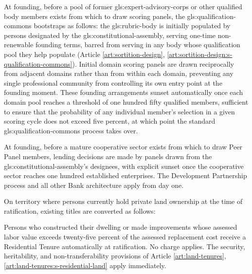 


At founding, before a pool of former \gls{gls:expert-advisory-corps} or other qualified body members exists from which to draw scoring panels, the \gls{gls:qualification-commons} bootstraps as follows: the \gls{gls:rubric-body} is initially populated by persons designated by the \gls{gls:constitutional-assembly}, serving one-time non-renewable founding terms, barred from serving in any body whose qualification pool they help populate (Article \ref{art:sortition-design}, \ref{art:sortition-design:s-qualification-commons}). Initial domain scoring panels are drawn reciprocally from adjacent domains rather than from within each domain, preventing any single professional community from controlling its own entry point at the founding moment. These founding arrangements sunset automatically once each domain pool reaches a threshold of one hundred fifty qualified members, sufficient to ensure that the probability of any individual member's selection in a given scoring cycle does not exceed five percent, at which point the standard \gls{gls:qualification-commons} process takes over.

At founding, before a mature cooperative sector exists from which to draw Peer Panel members, lending decisions are made by panels drawn from the \gls{gls:constitutional-assembly}'s designees, with explicit sunset once the cooperative sector reaches one hundred established enterprises. The Development Partnership process and all other Bank architecture apply from day one.

On territory where persons currently hold private land ownership at the time of ratification, existing titles are converted as follows:

Persons who constructed their dwelling or made improvements whose assessed labor value exceeds twenty-five percent of the assessed replacement cost receive a Residential Tenure automatically at ratification. No charge applies. The security, heritability, and non-transferability provisions of Article \ref{art:land-tenures}, \ref{art:land-tenures:s-residential-land} apply immediately.

